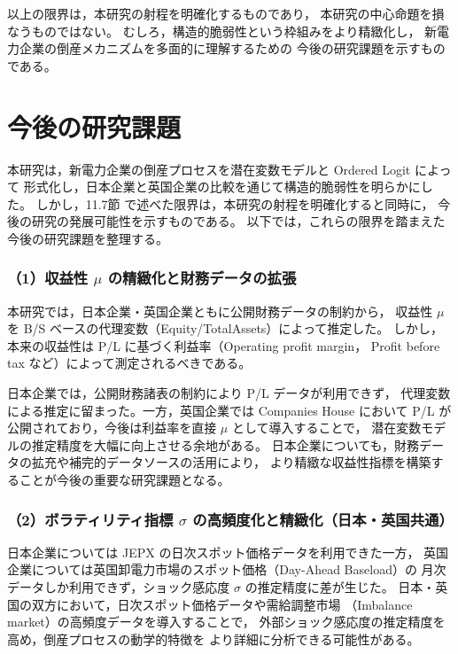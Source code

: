 以上の限界は，本研究の射程を明確化するものであり，
本研究の中心命題を損なうものではない。
むしろ，構造的脆弱性という枠組みをより精緻化し，
新電力企業の倒産メカニズムを多面的に理解するための
今後の研究課題を示すものである。



\section{今後の研究課題}

本研究は，新電力企業の倒産プロセスを潜在変数モデルと Ordered Logit によって
形式化し，日本企業と英国企業の比較を通じて構造的脆弱性を明らかにした。
しかし，11.7節 で述べた限界は，本研究の射程を明確化すると同時に，
今後の研究の発展可能性を示すものである。
以下では，これらの限界を踏まえた今後の研究課題を整理する。

\subsubsection*{（1）収益性 $\mu$ の精緻化と財務データの拡張}

本研究では，日本企業・英国企業ともに公開財務データの制約から，
収益性 $\mu$ を B/S ベースの代理変数（Equity/TotalAssets）によって推定した。
しかし，本来の収益性は P/L に基づく利益率（Operating profit margin，
Profit before tax など）によって測定されるべきである。

日本企業では，公開財務諸表の制約により P/L データが利用できず，
代理変数による推定に留まった。一方，英国企業では Companies House において
P/L が公開されており，今後は利益率を直接 $\mu$ として導入することで，
潜在変数モデルの推定精度を大幅に向上させる余地がある。
日本企業についても，財務データの拡充や補完的データソースの活用により，
より精緻な収益性指標を構築することが今後の重要な研究課題となる。

\subsubsection*{（2）ボラティリティ指標 $\sigma$ の高頻度化と精緻化（日本・英国共通）}

日本企業については JEPX の日次スポット価格データを利用できた一方，
英国企業については英国卸電力市場のスポット価格（Day-Ahead Baseload）の
月次データしか利用できず，ショック感応度 $\sigma$ の推定精度に差が生じた。
日本・英国の双方において，日次スポット価格データや需給調整市場
（Imbalance market）の高頻度データを導入することで，
外部ショック感応度の推定精度を高め，倒産プロセスの動学的特徴を
より詳細に分析できる可能性がある。

